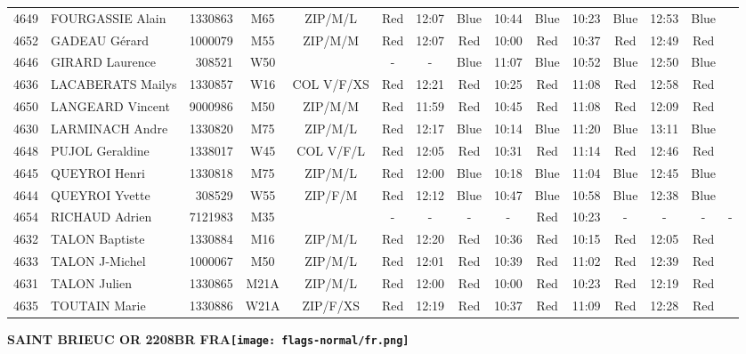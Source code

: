 \documentclass{report}
\begin{document}
\begin{longtable}{|c|l|r|c|c|*{5}{cc|}}
    4649 & FOURGASSIE Alain & 1330863 & M65 & ZIP/M/L & Red & 12:07 & Blue & 10:44 & Blue & 10:23 & Blue & 12:53 & Blue &  \\
    4652 & GADEAU Gérard & 1000079 & M55 & ZIP/M/M & Red & 12:07 & Red & 10:00 & Red & 10:37 & Red & 12:49 & Red &  \\
    4646 & GIRARD Laurence & 308521 & W50 &   & - &  - & Blue & 11:07 & Blue & 10:52 & Blue & 12:50 & Blue &  \\
    4636 & LACABERATS Mailys & 1330857 & W16 & COL V/F/XS & Red & 12:21 & Red & 10:25 & Red & 11:08 & Red & 12:58 & Red &  \\
    4650 & LANGEARD Vincent & 9000986 & M50 & ZIP/M/M & Red & 11:59 & Red & 10:45 & Red & 11:08 & Red & 12:09 & Red &  \\
    4630 & LARMINACH Andre & 1330820 & M75 & ZIP/M/L & Red & 12:17 & Blue & 10:14 & Blue & 11:20 & Blue & 13:11 & Blue &  \\
    4648 & PUJOL Geraldine & 1338017 & W45 & COL V/F/L & Red & 12:05 & Red & 10:31 & Red & 11:14 & Red & 12:46 & Red &  \\
    4645 & QUEYROI Henri & 1330818 & M75 & ZIP/M/L & Red & 12:00 & Blue & 10:18 & Blue & 11:04 & Blue & 12:45 & Blue &  \\
    4644 & QUEYROI Yvette & 308529 & W55 & ZIP/F/M & Red & 12:12 & Blue & 10:47 & Blue & 10:58 & Blue & 12:38 & Blue &  \\
    4654 & RICHAUD Adrien & 7121983 & M35 &   & - &  - & - &  - & Red & 10:23 & - &  - & - &  -\\
    4632 & TALON Baptiste & 1330884 & M16 & ZIP/M/L & Red & 12:20 & Red & 10:36 & Red & 10:15 & Red & 12:05 & Red &  \\
    4633 & TALON J-Michel & 1000067 & M50 & ZIP/M/L & Red & 12:01 & Red & 10:39 & Red & 11:02 & Red & 12:39 & Red &  \\
    4631 & TALON Julien & 1330865 & M21A & ZIP/M/L & Red & 12:00 & Red & 10:00 & Red & 10:23 & Red & 12:19 & Red &  \\
    4635 & TOUTAIN Marie & 1330886 & W21A & ZIP/F/XS & Red & 12:19 & Red & 10:37 & Red & 11:09 & Red & 12:28 & Red &  \\
  \end{longtable}
\newpage
  \Huge \centering \bfseries SAINT BRIEUC OR 2208BR FRA\normalfont \footnotesize \sffamily \hfill \texttt{[image: flags-normal/fr.png]} \newline 
\end{document}
